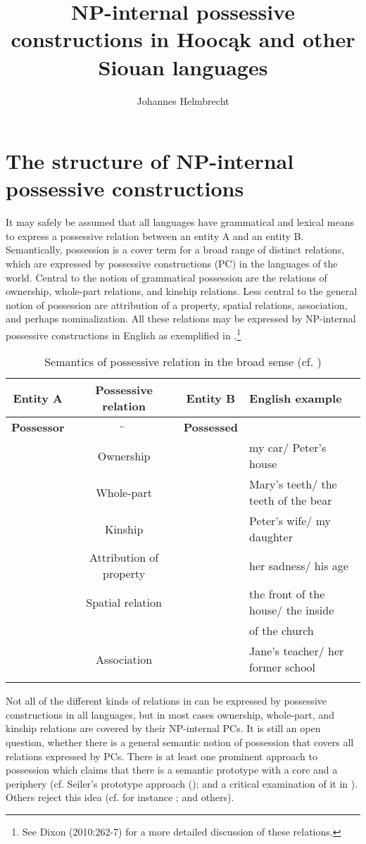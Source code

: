 \documentclass[output=paper]{LSP/langsci}
\author{Johannes Helmbrecht}
\title{NP-internal possessive constructions in Hoocąk and other Siouan languages}
\begin{document}
\section{The structure of NP-internal possessive constructions}
It may safely be assumed that all languages have grammatical and lexical means to express a possessive relation between an entity A and an entity B. Semantically, possession is a cover term for a broad range of distinct relations, which are expressed by possessive constructions (PC) in the languages of the world. Central to the notion of grammatical possession are the relations of ownership, whole-part relations, and kinship relations. Less central to the general notion of possession are attribution of a property, spatial relations, association, and perhaps nominalization. All these relations may be expressed by NP-internal possessive constructions in English as exemplified in .\footnote{See Dixon (2010:262-7) for a more detailed discussion of these relations.}

\begin{table}
\caption{Semantics of possessive relation in the broad sense (cf. \citealt[262-7]{Dixon2010})} \label{semantics}
\small
\begin{tabular}{ c c c l }
\lsptoprule
\textbf{Entity A}  & \textbf{Possessive relation}	 & \textbf{Entity B} & \textbf{English example} \\
\midrule 
\textbf{Possessor} & $\overleftrightarrow{\hspace{3cm}}$  & \textbf{Possessed} & \\
& Ownership	&  & my car/ Peter's house \\
& Whole-part	 & & Mary's teeth/ the teeth of the bear \\
& Kinship	 & & Peter's wife/ my daughter \\
& Attribution of property & & her sadness/ his age \\
& Spatial relation & & the front of the house/ the inside   \\
& & & of the church \\
& Association & & Jane's teacher/ her former school \\
\lspbottomrule
\end{tabular}
\end{table}

Not all of the different kinds of relations in  can be expressed by possessive constructions in all languages, but in most cases ownership, whole-part, and kinship relations are covered by their NP-internal PCs. It is still an open question, whether there is a general semantic notion of possession that covers all relations expressed by PCs. There is at least one prominent approach to possession which claims that there is a semantic prototype with a core and a periphery (cf. Seiler's prototype approach (\citealt{Seiler1983,Seiler2001}); and a critical examination of it in \citealt{Helmbrecht2003}). Others reject this idea (cf. for instance \citealt{Heine1997}; \citealt[263]{Dixon2010} and others).
\end{document}
